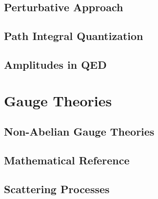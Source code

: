 \documentclass[a4paper, 12pt]{book}
\begin{document}
\chapter{Perturbative Approach}


\chapter{Path Integral Quantization}


\chapter{Amplitudes in QED}


\part{Gauge Theories}
\pagestyle{body}

\chapter{Non-Abelian Gauge Theories}


\begin{appendices}
\pagestyle{append}

\chapter{Mathematical Reference}


\chapter{Scattering Processes}


\clearpage
\end{appendices}

\pagestyle{biblio}
\printbibliography[heading = bibintoc, title = {Bibliography}]
\end{document}

